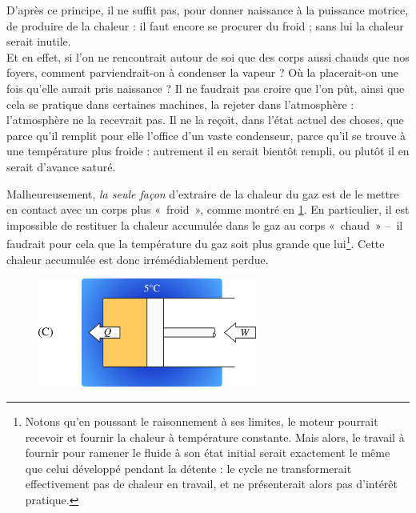 			D’après ce principe, il ne suffit pas, pour donner naissance à la puissance motrice, de produire de la chaleur : il faut encore se procurer du froid ; sans lui la chaleur serait inutile.\\
			Et en effet, si l’on ne rencontrait autour de soi que des corps aussi chauds que nos foyers, comment parviendrait-on à condenser la vapeur ? Où la placerait-on une fois qu’elle aurait pris naissance ? Il ne faudrait pas croire que l’on pût, ainsi que cela se pratique dans certaines machines, la rejeter dans l’atmosphère : l’atmosphère ne la recevrait pas. Il ne la reçoit, dans l’état actuel des choses, que parce qu’il remplit pour elle l’office d’un vaste condenseur, parce qu’il se trouve à une température plus froide : autrement il en serait bientôt rempli, ou plutôt il en serait d’avance saturé.%

		Malheureusement, \emph{la seule façon} d’extraire de la chaleur du gaz est de le mettre en contact avec un corps plus «~froid~», comme montré en \cref{fig_démo_second_principe_2}. En particulier, il est impossible de restituer la chaleur accumulée dans le gaz au corps «~chaud~» --\ il faudrait pour cela que la température du gaz soit plus grande que lui\footnote{Notons qu’en poussant le raisonnement à ses limites, le moteur pourrait recevoir et fournir la chaleur à température constante. Mais alors, le travail à fournir pour ramener le fluide à son état initial serait exactement le même que celui développé pendant la détente : le cycle ne transformerait effectivement pas de chaleur en travail, et ne présenterait alors pas d’intérêt pratique.}. Cette chaleur accumulée est donc irrémédiablement perdue.

		\begin{figure}
			\begin{center}
				\includegraphics[width=7.2cm]{images/demo_second_principe_2.png}
			\end{center}
			\label{fig_démo_second_principe_2}
		\end{figure}

